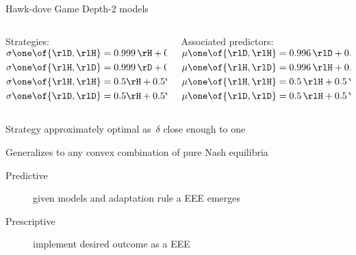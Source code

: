 \begin{frame}{Hawk-dove Game}
Depth-2 models

\bigskip

\begin{columns}
\begin{column}{0.45\textwidth}
Strategies:\\
\(
\begin{aligned}
\sigma\one \of{\rlD, \rlH} & = 0.999 \, \rH + 0.001 \, \rD \\
\sigma\one \of{\rlH, \rlD} & = 0.999 \, \rD + 0.001 \, \rH \\
\sigma\one \of{\rlH, \rlH} & = 0.5 \rH + 0.5 \rD \\
\sigma\one \of{\rlD, \rlD} & = 0.5 \rH + 0.5 \rD
\end{aligned}
\)
\end{column}
\begin{column}{0.45\textwidth}
Associated predictors:\\
\(\begin{aligned}
\mu\one \of{\rlD, \rlH} & = 0.996 \, \rlD + 0.004 \, \rlH \\
\mu\one \of{\rlH, \rlD} & = 0.996 \, \rlH + 0.004 \, \rlD \\
\mu\one \of{\rlH, \rlH} & = 0.5 \, \rlH + 0.5 \, \rlD \\
\mu\one \of{\rlD, \rlD} & = 0.5 \, \rlH + 0.5 \, \rlD
\end{aligned}\)
\end{column}
\end{columns}

\bigskip

Strategy approximately optimal as~\(\delta\) close enough to one

\bigskip

Generalizes to any convex combination of pure Nash equilibria
\end{frame}
\recap
\begin{frame}
\begin{description}
\item[Predictive] given models and adaptation rule a EEE emerges
\item[Prescriptive] implement desired outcome as a EEE
\end{description}
\end{frame}
